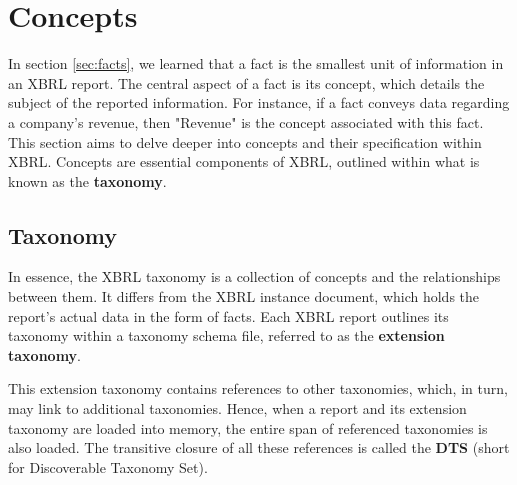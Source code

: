 \section{Concepts}
\label{sec:concepts}

In section \ref{sec:facts}, we learned that a fact is the smallest unit of information in an XBRL report. 
The central aspect of a fact is its concept,
which details the subject of the reported information.
For instance, if a fact conveys data regarding a company's revenue, then "Revenue" is the concept associated with this fact.
This section aims to delve deeper into concepts and their specification within XBRL.
Concepts are essential components of XBRL, outlined within what is known as the \textbf{taxonomy}.

\subsection{Taxonomy}

In essence, the XBRL taxonomy is a collection of concepts and the relationships between them.
It differs from the XBRL instance document, which holds the report's actual data in the form of facts.
Each XBRL report outlines its taxonomy within a taxonomy schema file,
referred to as the \textbf{extension taxonomy}.

This extension taxonomy contains references to other taxonomies, which, in turn, may link to additional taxonomies.
Hence, when a report and its extension taxonomy are loaded into memory, the entire span of referenced taxonomies is also loaded.
The transitive closure of all these references is called the \textbf{DTS} (short for Discoverable Taxonomy Set).


